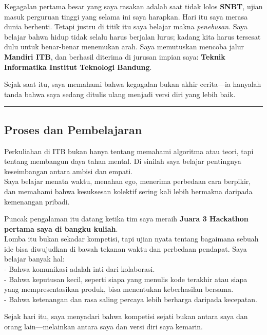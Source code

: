 \documentclass[
  letterpaper,
  DIV=11,
  numbers=noendperiod]{scrreprt}
\begin{document}
Kegagalan pertama besar yang saya rasakan adalah saat tidak lolos
\textbf{SNBT}, ujian masuk perguruan tinggi yang selama ini saya
harapkan. Hari itu saya merasa dunia berhenti. Tetapi justru di titik
itu saya belajar makna \emph{penebusan}. Saya belajar bahwa hidup tidak
selalu harus berjalan lurus; kadang kita harus tersesat dulu untuk
benar-benar menemukan arah. Saya memutuskan mencoba jalur
\textbf{Mandiri ITB}, dan berhasil diterima di jurusan impian saya:
\textbf{Teknik Informatika Institut Teknologi Bandung}.

Sejak saat itu, saya memahami bahwa kegagalan bukan akhir cerita---ia
hanyalah tanda bahwa saya sedang ditulis ulang menjadi versi diri yang
lebih baik.

\begin{center}\rule{0.5\linewidth}{0.5pt}\end{center}

\subsection{\texorpdfstring{\textbf{Proses dan
Pembelajaran}}{Proses dan Pembelajaran}}\label{proses-dan-pembelajaran}

Perkuliahan di ITB bukan hanya tentang memahami algoritma atau teori,
tapi tentang membangun daya tahan mental. Di sinilah saya belajar
pentingnya keseimbangan antara ambisi dan empati.\\
Saya belajar menata waktu, menahan ego, menerima perbedaan cara
berpikir, dan memahami bahwa kesuksesan kolektif sering kali lebih
bermakna daripada kemenangan pribadi.

Puncak pengalaman itu datang ketika tim saya meraih \textbf{Juara 3
Hackathon pertama saya di bangku kuliah}.\\
Lomba itu bukan sekadar kompetisi, tapi ujian nyata tentang bagaimana
sebuah ide bisa diwujudkan di bawah tekanan waktu dan perbedaan
pendapat. Saya belajar banyak hal:\\
- Bahwa komunikasi adalah inti dari kolaborasi.\\
- Bahwa keputusan kecil, seperti siapa yang menulis kode terakhir atau
siapa yang mempresentasikan produk, bisa menentukan keberhasilan
bersama.\\
- Bahwa ketenangan dan rasa saling percaya lebih berharga daripada
kecepatan.

Sejak hari itu, saya menyadari bahwa kompetisi sejati bukan antara saya
dan orang lain---melainkan antara saya dan versi diri saya kemarin.
\end{document}
